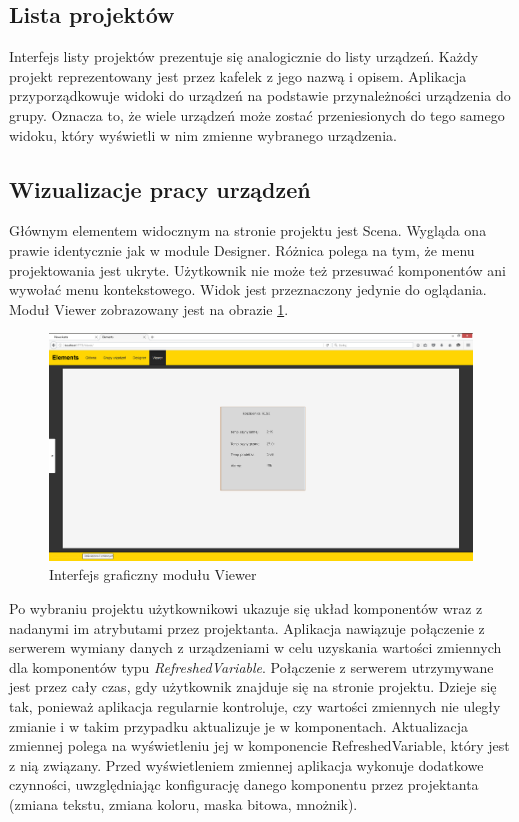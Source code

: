 \subsection{Lista projektów}
Interfejs listy projektów prezentuje się analogicznie do listy urządzeń. Każdy projekt reprezentowany jest przez kafelek z jego nazwą i opisem. Aplikacja przyporządkowuje widoki do urządzeń na podstawie przynależności urządzenia do grupy. Oznacza to, że wiele urządzeń może zostać przeniesionych do tego samego widoku, który wyświetli w nim zmienne wybranego urządzenia.

\subsection{Wizualizacje pracy urządzeń}
Głównym elementem widocznym na stronie projektu jest Scena. Wygląda ona prawie identycznie jak w module Designer. Różnica polega na tym, że menu projektowania jest ukryte. Użytkownik nie może też przesuwać komponentów ani wywołać menu kontekstowego. Widok jest przeznaczony jedynie do oglądania. Moduł Viewer zobrazowany jest na obrazie \ref{fig:viewer_project}.

\begin{figure}[h]
\centerline{
	\includegraphics[width=180mm]{./img/screen/viewer_projekt.png}
}
	\caption{Interfejs graficzny modułu Viewer}
	\label{fig:viewer_project}
\end{figure}
	
Po wybraniu projektu użytkownikowi ukazuje się układ komponentów wraz z nadanymi im atrybutami przez projektanta. Aplikacja nawiązuje połączenie z serwerem wymiany danych z urządzeniami w celu uzyskania wartości zmiennych dla komponentów typu \textit{RefreshedVariable}. Połączenie z serwerem utrzymywane jest przez cały czas, gdy użytkownik znajduje się na stronie projektu. Dzieje się tak, ponieważ aplikacja regularnie kontroluje, czy wartości zmiennych nie uległy zmianie i w takim przypadku aktualizuje je w komponentach. Aktualizacja zmiennej polega na wyświetleniu jej w komponencie RefreshedVariable, który jest z nią związany. Przed wyświetleniem zmiennej aplikacja wykonuje dodatkowe czynności, uwzględniając konfigurację danego komponentu przez projektanta (zmiana tekstu, zmiana koloru, maska bitowa, mnożnik).

